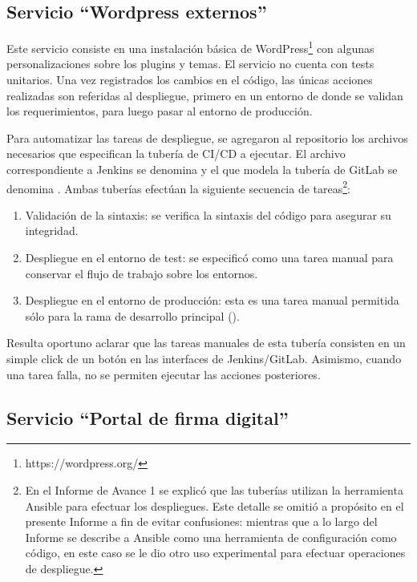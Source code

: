 \subsection{Servicio ``Wordpress externos''}

Este servicio consiste en una instalación básica de
WordPress\footnote{ https://wordpress.org/} con algunas
personalizaciones sobre los plugins y temas. El servicio no cuenta con
tests unitarios. Una vez registrados los cambios en el código, las
únicas acciones realizadas son referidas al despliegue, primero en un
entorno de  donde se validan los requerimientos, para
luego pasar al entorno de producción.

Para automatizar las tareas de despliegue, se agregaron al repositorio
los archivos necesarios que especifican la tubería de CI/CD a
ejecutar. El archivo correspondiente a Jenkins se denomina
 y el que modela la tubería de GitLab se denomina
. Ambas tuberías efectúan la siguiente
secuencia de tareas\footnote{ En el Informe de Avance 1 se explicó que
  las tuberías utilizan la herramienta Ansible para efectuar los
  despliegues. Este detalle se omitió a propósito en el presente
  Informe a fin de evitar confusiones: mientras que a lo largo del
  Informe se describe a Ansible como una herramienta de configuración
  como código, en este caso se le dio otro uso experimental para
  efectuar operaciones de despliegue.}:

\begin{enumerate}
\item Validación de la sintaxis: se verifica la sintaxis del código
  para asegurar su integridad.
\item Despliegue en el entorno de test: se especificó como una tarea
  manual para conservar el flujo de trabajo sobre los entornos.
\item Despliegue en el entorno de producción: esta es una tarea manual
  permitida sólo para la rama de desarrollo principal
  ().
\end{enumerate}
Resulta oportuno aclarar que las tareas manuales de esta tubería
consisten en un simple click de un botón en las interfaces de
Jenkins/GitLab. Asimismo, cuando una tarea falla, no se permiten
ejecutar las acciones posteriores.

\subsection{Servicio ``Portal de firma digital''}

